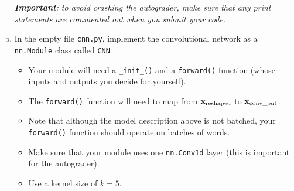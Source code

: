 \begin{enumerate}[(a)]
    \textit{\textbf{Important}: to avoid crashing the autograder, make sure that any print statements are commented out when you submit your code.}
    
    \item \label{qn:cnn}
    In the empty file \texttt{cnn.py}, implement the convolutional network as a \texttt{nn.Module} class called \texttt{CNN}.
    \begin{itemize}
        \item Your module will need a \texttt{\_init\_()} and a \texttt{forward()} function (whose inputs and outputs you decide for yourself).
        \item The \texttt{forward()} function will need to map from $\mathbf{x}_\text{reshaped}$ to $\mathbf{x}_\text{conv\_out}$.
        \item Note that although the model description above is not batched, your \texttt{forward()} function should operate on batches of words.
        \item Make sure that your module uses one \texttt{nn.Conv1d} layer (this is important for the autograder).
        \item Use a kernel size of $k=5$.
    \end{itemize}


\end{enumerate}
